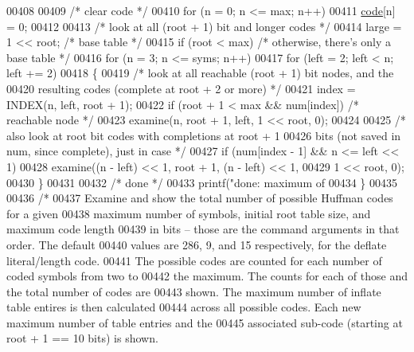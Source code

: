 \begin{DoxyCode}
{{00408 
00409     \textcolor{comment}{/* clear code */}
00410     \textcolor{keywordflow}{for} (n = 0; n <= max; n++)
00411         \hyperlink{structcode}{code}[n] = 0;
00412 
00413     \textcolor{comment}{/* look at all (root + 1) bit and longer codes */}
00414     large = 1 << root;              \textcolor{comment}{/* base table */}
00415     \textcolor{keywordflow}{if} (root < max)                 \textcolor{comment}{/* otherwise, there's only a base table */}
00416         \textcolor{keywordflow}{for} (n = 3; n <= syms; n++)
00417             \textcolor{keywordflow}{for} (left = 2; left < n; left += 2)
00418             \{
00419                 \textcolor{comment}{/* look at all reachable (root + 1) bit nodes, and the}
00420 \textcolor{comment}{                   resulting codes (complete at root + 2 or more) */}
00421                 index = INDEX(n, left, root + 1);
00422                 \textcolor{keywordflow}{if} (root + 1 < max && num[index])       \textcolor{comment}{/* reachable node */}
00423                     examine(n, root + 1, left, 1 << root, 0);
00424 
00425                 \textcolor{comment}{/* also look at root bit codes with completions at root + 1}
00426 \textcolor{comment}{                   bits (not saved in num, since complete), just in case */}
00427                 \textcolor{keywordflow}{if} (num[index - 1] && n <= left << 1)
00428                     examine((n - left) << 1, root + 1, (n - left) << 1,
00429                             1 << root, 0);
00430             \}
00431 
00432     \textcolor{comment}{/* done */}
00433     printf(\textcolor{stringliteral}{"done: maximum of %
00434 \}
00435 
00436 \textcolor{comment}{/*}
00437 \textcolor{comment}{   Examine and show the total number of possible Huffman codes for a given}
00438 \textcolor{comment}{   maximum number of symbols, initial root table size, and maximum code length}
00439 \textcolor{comment}{   in bits -- those are the command arguments in that order.  The default}
00440 \textcolor{comment}{   values are 286, 9, and 15 respectively, for the deflate literal/length code.}
00441 \textcolor{comment}{   The possible codes are counted for each number of coded symbols from two to}
00442 \textcolor{comment}{   the maximum.  The counts for each of those and the total number of codes are}
00443 \textcolor{comment}{   shown.  The maximum number of inflate table entires is then calculated}
00444 \textcolor{comment}{   across all possible codes.  Each new maximum number of table entries and the}
00445 \textcolor{comment}{   associated sub-code (starting at root + 1 == 10 bits) is shown.}
}}}
\end{DoxyCode}
